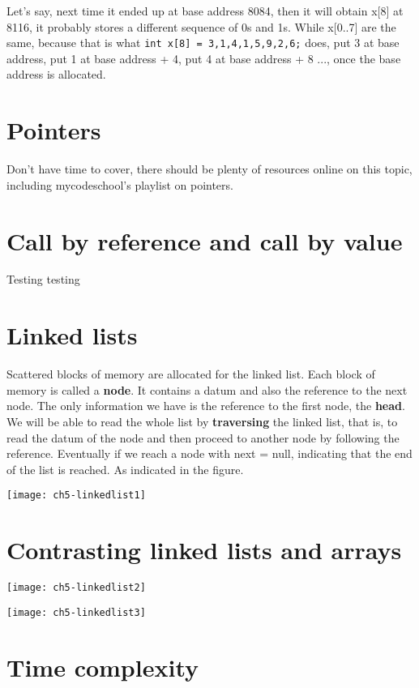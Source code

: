 Let's say, next time it ended up at base address 8084, then it will obtain x[8] at 8116, it probably stores a different sequence of 0s and 1s. While x[0..7] are the same, because that is what \texttt{int x[8] = {3,1,4,1,5,9,2,6};} does, put 3 at base address, put 1 at base address + 4, put 4 at base address + 8 ..., once the base address is allocated.

\section{Pointers}

Don't have time to cover, there should be plenty of resources online on this topic, including mycodeschool's playlist on pointers.

\section{Call by reference and call by value}

Testing testing

\section{Linked lists}

Scattered blocks of memory are allocated for the linked list. Each block of memory is called a \textbf{node}. It contains a datum and also the reference to the next node. The only information we have is the reference to the first node, the \textbf{head}. We will be able to read the whole list by \textbf{traversing} the linked list, that is, to read the datum of the node and then proceed to another node by following the reference. Eventually if we reach a node with next = null, indicating that the end of the list is reached. As indicated in the figure.

\texttt{[image: ch5-linkedlist1]}

\section{Contrasting linked lists and arrays}

\texttt{[image: ch5-linkedlist2]}

\texttt{[image: ch5-linkedlist3]}

\section{Time complexity}



